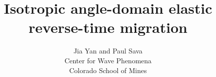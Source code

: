 \title{Isotropic angle-domain elastic reverse-time migration}
\author{Jia Yan and Paul Sava \\ 
Center for Wave Phenomena \\ 
Colorado School of Mines}

\maketitle





\def\geouline#1{#1}
\def\geosout#1{}

     
 
  
 
     
        
     
   
  




